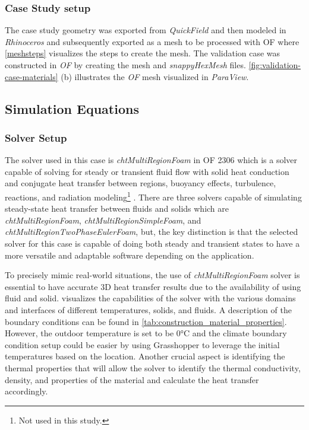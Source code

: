 \subsubsection{Case Study setup}
The case study geometry was exported from \textit{QuickField} and then modeled in \textit{Rhinoceros} and subsequently exported as a mesh to be processed with  \gls{OF} where \ref{meshsteps} visualizes the steps to create the mesh. 
The validation case was constructed in \textit{ \gls{OF}} by creating the mesh and \textit{snappyHexMesh} files.  
\ref{fig:validation-case-materials}  (b) illustrates the \textit{\gls{OF}} mesh visualized in \textit{ParaView}.
    



\subsection{Simulation Equations}

\subsubsection{Solver Setup}
The solver used in this case is \textit{chtMultiRegionFoam} in  \gls{OF} 2306 which is a solver capable of solving for steady or transient fluid flow with solid heat conduction and conjugate heat transfer between regions, buoyancy effects, turbulence, reactions, and radiation modeling\footnote{Not used in this study.} \cite{cht}.
There are three solvers capable of simulating steady-state heat transfer between fluids and solids which are \textit{chtMultiRegionFoam}, \textit{chtMultiRegionSimpleFoam}, and \textit{chtMultiRegionTwoPhaseEulerFoam}, but, the key distinction is that the selected solver for this case is capable of doing both steady and transient states to have a more versatile and adaptable software depending on the application. 


To precisely mimic real-world situations, the use of \textit{ chtMultiRegionFoam} solver is essential to have accurate 3D heat transfer results due to the availability of using fluid and solid.  visualizes the capabilities of the solver with the various domains and interfaces of different temperatures, solids, and fluids. 
A description of the boundary conditions can be found in \cref{tab:construction_material_properties}. 
However, the outdoor temperature is set to be 0°C and the climate boundary condition setup could be easier by using Grasshopper to leverage the initial temperatures based on the location. 
Another crucial aspect is identifying the thermal properties that will allow the solver to identify the thermal conductivity, density, and properties of the material and calculate the heat transfer accordingly.

